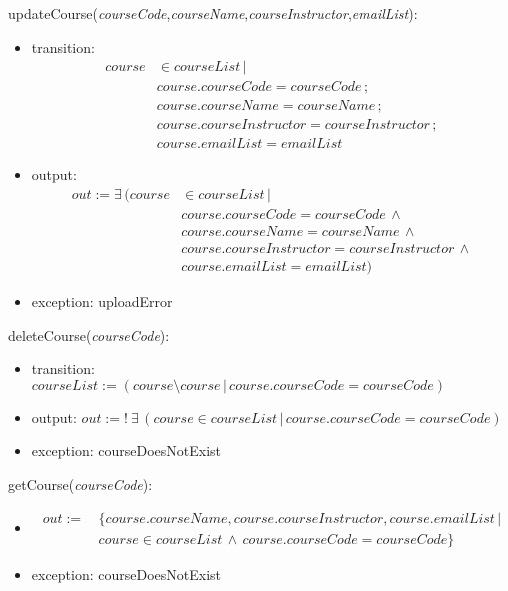 \documentclass[12pt, titlepage]{article}
\begin{document}
\noindent updateCourse(\textit{courseCode},\textit{courseName},\textit{courseInstructor},\textit{emailList}):
\begin{itemize}
\item transition:
\begin{align*}
course &\in courseList \, | \\
&course.courseCode = courseCode \, ; \\
&course.courseName = courseName \, ; \\
&course.courseInstructor = courseInstructor \, ; \\
&course.emailList = emailList
\end{align*}
\item output: 
\begin{align*}
out := \exists \, (course &\in courseList \, | \\
&course.courseCode = courseCode \, \land \\
&course.courseName = courseName \, \land \\
&course.courseInstructor = courseInstructor \, \land \\
&course.emailList = emailList)
\end{align*}
\item exception: uploadError
\end{itemize}


\noindent deleteCourse(\textit{courseCode}):
\begin{itemize}
\item transition: \(courseList := (course \setminus course \, | \, course.courseCode = courseCode )\)
\item output: $out := \mathit{! \ \exists \, (course \in courseList \, | \, course.courseCode = courseCode)
}$
\item exception: courseDoesNotExist
\end{itemize}

\noindent getCourse(\textit{courseCode}):
\begin{itemize}
\item 
\begin{align*}
out := &\, \{course.courseName, course.courseInstructor, course.emailList\, | \\
&\, course \in courseList \, \land \, course.courseCode = courseCode\}
\end{align*}

\item exception: courseDoesNotExist
\end{itemize}
\end{document}
